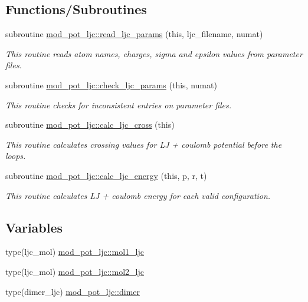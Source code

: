 \subsection*{Functions/\+Subroutines}
\begin{DoxyCompactItemize}
\item 
subroutine \hyperlink{namespacemod__pot__ljc_aba75dd17c928cdddf564bf03d18b3ee2}{mod\+\_\+pot\+\_\+ljc\+::read\+\_\+ljc\+\_\+params} (this, ljc\+\_\+filename, numat)
\begin{DoxyCompactList}\small\item\em This routine reads atom names, charges, sigma and epsilon values from parameter files. \end{DoxyCompactList}\item 
subroutine \hyperlink{namespacemod__pot__ljc_ae251ed7b35f9a6401200390d8684ea46}{mod\+\_\+pot\+\_\+ljc\+::check\+\_\+ljc\+\_\+params} (this, numat)
\begin{DoxyCompactList}\small\item\em This routine checks for inconsistent entries on parameter files. \end{DoxyCompactList}\item 
subroutine \hyperlink{namespacemod__pot__ljc_aea69edf70ec804ebb8075741c84ab50b}{mod\+\_\+pot\+\_\+ljc\+::calc\+\_\+ljc\+\_\+cross} (this)
\begin{DoxyCompactList}\small\item\em This routine calculates crossing values for LJ + coulomb potential before the loops. \end{DoxyCompactList}\item 
subroutine \hyperlink{namespacemod__pot__ljc_a13c36fde6ac0af7265630bc8105c23b6}{mod\+\_\+pot\+\_\+ljc\+::calc\+\_\+ljc\+\_\+energy} (this, p, r, t)
\begin{DoxyCompactList}\small\item\em This routine calculates LJ + coulomb energy for each valid configuration. \end{DoxyCompactList}\end{DoxyCompactItemize}
\subsection*{Variables}
\begin{DoxyCompactItemize}
\item 
type(ljc\+\_\+mol) \hyperlink{namespacemod__pot__ljc_a840c66fc49efca8db3e2c54932a77356}{mod\+\_\+pot\+\_\+ljc\+::mol1\+\_\+ljc}
\item 
type(ljc\+\_\+mol) \hyperlink{namespacemod__pot__ljc_a2b003eb4461125a250324cf11fdd50c7}{mod\+\_\+pot\+\_\+ljc\+::mol2\+\_\+ljc}
\item 
type(dimer\+\_\+ljc) \hyperlink{namespacemod__pot__ljc_abbcaeaac6c53085e893805852918464d}{mod\+\_\+pot\+\_\+ljc\+::dimer}
\end{DoxyCompactItemize}
